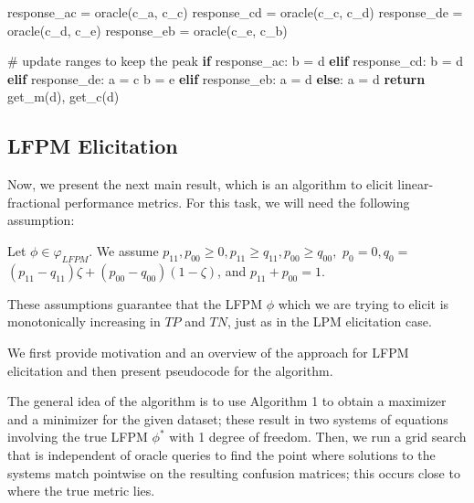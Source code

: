 \documentclass[
  letterpaper,
  numbers=noenddot,
  DIV=11,
  oneside]{scrreprt}
\newenvironment{Shaded}{\begin{snugshade}}{\end{snugshade}}
\newcommand{\CommentTok}[1]{\textcolor[rgb]{0.37,0.37,0.37}{#1}}
\newcommand{\ControlFlowTok}[1]{\textcolor[rgb]{0.00,0.23,0.31}{\textbf{#1}}}
\newcommand{\NormalTok}[1]{\textcolor[rgb]{0.00,0.23,0.31}{#1}}
\newcommand{\OperatorTok}[1]{\textcolor[rgb]{0.37,0.37,0.37}{#1}}
\theoremstyle{remark}
\begin{document}
\begin{Shaded}
\begin{Highlighting}[numbers=left,,]
\NormalTok{        response\_ac }\OperatorTok{=}\NormalTok{ oracle(c\_a, c\_c)}
\NormalTok{        response\_cd }\OperatorTok{=}\NormalTok{ oracle(c\_c, c\_d)}
\NormalTok{        response\_de }\OperatorTok{=}\NormalTok{ oracle(c\_d, c\_e)}
\NormalTok{        response\_eb }\OperatorTok{=}\NormalTok{ oracle(c\_e, c\_b)}

        \CommentTok{\# update ranges to keep the peak}
        \ControlFlowTok{if}\NormalTok{ response\_ac:}
\NormalTok{            b }\OperatorTok{=}\NormalTok{ d}
        \ControlFlowTok{elif}\NormalTok{ response\_cd:}
\NormalTok{            b }\OperatorTok{=}\NormalTok{ d}
        \ControlFlowTok{elif}\NormalTok{ response\_de:}
\NormalTok{            a }\OperatorTok{=}\NormalTok{ c}
\NormalTok{            b }\OperatorTok{=}\NormalTok{ e}
        \ControlFlowTok{elif}\NormalTok{ response\_eb:}
\NormalTok{            a }\OperatorTok{=}\NormalTok{ d}
        \ControlFlowTok{else}\NormalTok{:}
\NormalTok{            a }\OperatorTok{=}\NormalTok{ d}
    \ControlFlowTok{return}\NormalTok{ get\_m(d), get\_c(d)}
\end{Highlighting}
\end{Shaded}

\subsection{LFPM Elicitation}\label{sec-orga500da1}

Now, we present the next main result, which is an algorithm to elicit
linear-fractional performance metrics. For this task, we will need the
following assumption:

Let \(\phi \in \varphi_{L F P M}\). We assume
\(p_{11}, p_{00} \geq 0, p_{11} \geq q_{11}, p_{00} \geq q_{00},\)
\(p_{0}=0, q_{0}=\)
\(\left(p_{11}-q_{11}\right) \zeta+\left(p_{00}-q_{00}\right)(1-\zeta)\),
and \(p_{11}+p_{00}=1\).

These assumptions guarantee that the LFPM \(\phi\) which we are trying
to elicit is monotonically increasing in \(TP\) and \(TN\), just as in
the LPM elicitation case.

We first provide motivation and an overview of the approach for LFPM
elicitation and then present pseudocode for the algorithm.

The general idea of the algorithm is to use Algorithm 1 to obtain a
maximizer and a minimizer for the given dataset; these result in two
systems of equations involving the true LFPM \(\phi^*\) with 1 degree of
freedom. Then, we run a grid search that is independent of oracle
queries to find the point where solutions to the systems match pointwise
on the resulting confusion matrices; this occurs close to where the true
metric lies.
\end{document}
